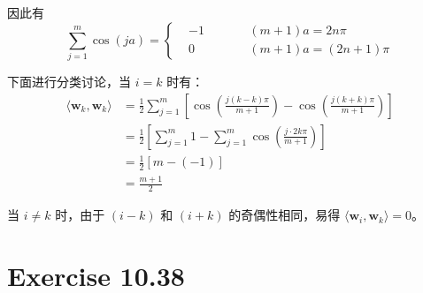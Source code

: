 \documentclass[a4paper]{article}
\begin{document}
\par 因此有
\begin{equation}
    \sum_{j=1}^m \cos (ja)
    =\left\{
        \begin{aligned}
            &-1 &\qquad &(m+1)a = 2n\pi \\
            &0 &\qquad &(m+1)a = (2n+1)\pi
        \end{aligned}
    \right.
\end{equation}
\par 下面进行分类讨论，当 $i=k$ 时有：
\begin{equation}
    \begin{aligned}
        \langle \mathbf{w}_k, \mathbf{w}_k \rangle
        &= \frac{1}{2}\sum_{j=1}^m \left[ \cos\left(\frac{j(k-k)\pi}{m+1}\right) - \cos\left(\frac{j(k+k)\pi}{m+1}\right) \right] \\
        &= \frac{1}{2}\left[ \sum_{j=1}^m 1 - \sum_{j=1}^m\cos\left(\frac{j \cdot 2k \pi}{m+1}\right) \right] \\
        &= \frac{1}{2}\left[ m - (-1) \right] \\
        &=\frac{m+1}{2}
    \end{aligned}
\end{equation}
\par 当 $i\neq k$ 时，由于 $(i-k)$ 和 $(i+k)$ 的奇偶性相同，易得
$\langle \mathbf{w}_i, \mathbf{w}_k \rangle = 0$。

\section*{Exercise 10.38}
\end{document}
